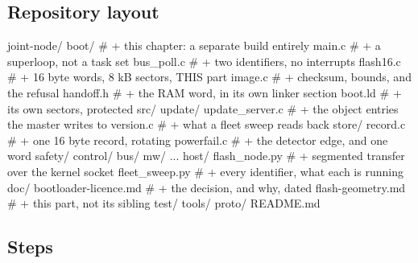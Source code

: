 \subsection*{Repository layout}

\begin{plaincode}
joint-node/
  boot/                            # + this chapter: a separate build entirely
    main.c                         # + a superloop, not a task set
    bus_poll.c                     # + two identifiers, no interrupts
    flash16.c                      # + 16 byte words, 8 kB sectors, THIS part
    image.c                        # + checksum, bounds, and the refusal
    handoff.h                      # + the RAM word, in its own linker section
    boot.ld                        # + its own sectors, protected
  src/
    update/
      update_server.c              # + the object entries the master writes to
      version.c                    # + what a fleet sweep reads back
    store/
      record.c                     # + one 16 byte record, rotating
      powerfail.c                  # + the detector edge, and one word
    safety/ control/ bus/ mw/ ...
  host/
    flash_node.py                  # + segmented transfer over the kernel socket
    fleet_sweep.py                 # + every identifier, what each is running
  doc/
    bootloader-licence.md          # + the decision, and why, dated
    flash-geometry.md              # + this part, not its sibling
  test/  tools/  proto/  README.md
\end{plaincode}

\subsection*{Steps}

